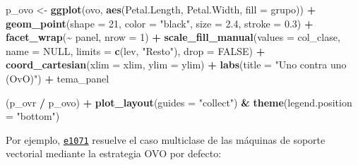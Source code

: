 \documentclass[
]{book}
\newenvironment{Shaded}{\begin{snugshade}}{\end{snugshade}}
\newcommand{\AttributeTok}[1]{\textcolor[rgb]{0.13,0.29,0.53}{#1}}
\newcommand{\ConstantTok}[1]{\textcolor[rgb]{0.56,0.35,0.01}{#1}}
\newcommand{\DecValTok}[1]{\textcolor[rgb]{0.00,0.00,0.81}{#1}}
\newcommand{\FloatTok}[1]{\textcolor[rgb]{0.00,0.00,0.81}{#1}}
\newcommand{\FunctionTok}[1]{\textcolor[rgb]{0.13,0.29,0.53}{\textbf{#1}}}
\newcommand{\NormalTok}[1]{#1}
\newcommand{\OtherTok}[1]{\textcolor[rgb]{0.56,0.35,0.01}{#1}}
\newcommand{\SpecialCharTok}[1]{\textcolor[rgb]{0.81,0.36,0.00}{\textbf{#1}}}
\newcommand{\StringTok}[1]{\textcolor[rgb]{0.31,0.60,0.02}{#1}}
\theoremstyle{break}
\theoremstyle{nonumberplain}
\begin{document}
\begin{Shaded}
\begin{Highlighting}[]
\NormalTok{p\_ovo }\OtherTok{\textless{}{-}} \FunctionTok{ggplot}\NormalTok{(ovo, }\FunctionTok{aes}\NormalTok{(Petal.Length, Petal.Width, }\AttributeTok{fill =}\NormalTok{ grupo)) }\SpecialCharTok{+}
  \FunctionTok{geom\_point}\NormalTok{(}\AttributeTok{shape =} \DecValTok{21}\NormalTok{, }\AttributeTok{color =} \StringTok{"black"}\NormalTok{, }\AttributeTok{size =} \FloatTok{2.4}\NormalTok{, }\AttributeTok{stroke =} \FloatTok{0.3}\NormalTok{) }\SpecialCharTok{+}
  \FunctionTok{facet\_wrap}\NormalTok{(}\SpecialCharTok{\textasciitilde{}}\NormalTok{ panel, }\AttributeTok{nrow =} \DecValTok{1}\NormalTok{) }\SpecialCharTok{+}
  \FunctionTok{scale\_fill\_manual}\NormalTok{(}\AttributeTok{values =}\NormalTok{ col\_clase, }\AttributeTok{name =} \ConstantTok{NULL}\NormalTok{,}
                     \AttributeTok{limits =} \FunctionTok{c}\NormalTok{(lev, }\StringTok{"Resto"}\NormalTok{), }\AttributeTok{drop =} \ConstantTok{FALSE}\NormalTok{) }\SpecialCharTok{+}
  \FunctionTok{coord\_cartesian}\NormalTok{(}\AttributeTok{xlim =}\NormalTok{ xlim, }\AttributeTok{ylim =}\NormalTok{ ylim) }\SpecialCharTok{+}
  \FunctionTok{labs}\NormalTok{(}\AttributeTok{title =} \StringTok{"Uno contra uno (OvO)"}\NormalTok{) }\SpecialCharTok{+}
\NormalTok{  tema\_panel}

\NormalTok{(p\_ovr }\SpecialCharTok{/}\NormalTok{ p\_ovo) }\SpecialCharTok{+}
  \FunctionTok{plot\_layout}\NormalTok{(}\AttributeTok{guides =} \StringTok{"collect"}\NormalTok{) }\SpecialCharTok{\&}
  \FunctionTok{theme}\NormalTok{(}\AttributeTok{legend.position =} \StringTok{"bottom"}\NormalTok{)}
\end{Highlighting}
\end{Shaded}

Por ejemplo, \href{https://cran.r-project.org/package=e1071}{\texttt{e1071}} resuelve el caso multiclase de las máquinas de soporte vectorial mediante la estrategia OVO por defecto:

\begin{Shaded}
\end{Shaded}
\end{document}
